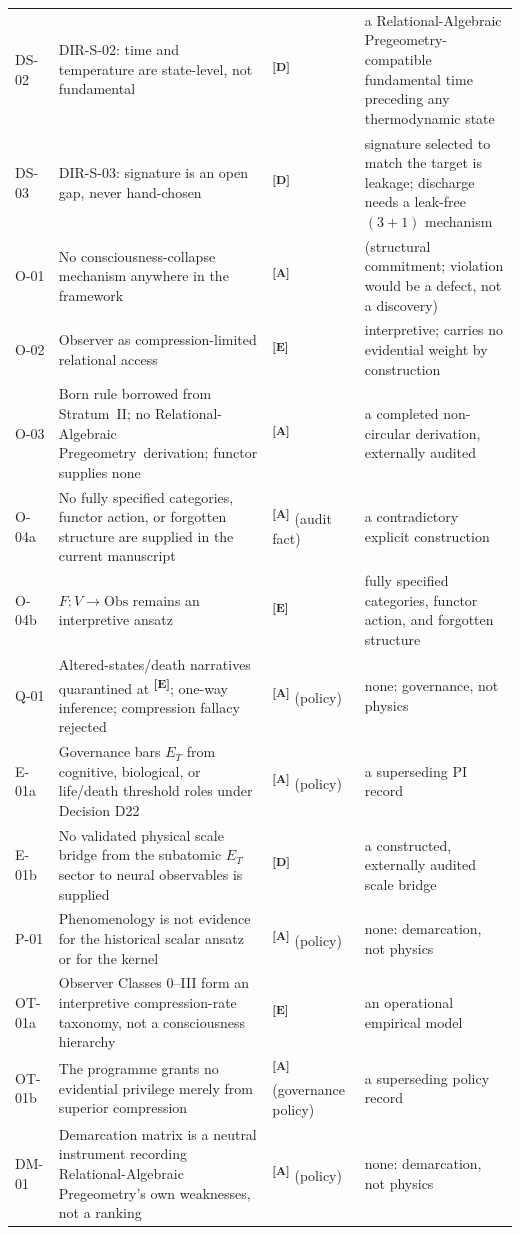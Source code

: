 \documentclass[12pt,a4paper,twoside]{article}
\theoremstyle{plain}
\theoremstyle{definition}
\theoremstyle{remark}
\newcommand{\ProjectShort}{Relational-Algebraic Pregeometry}
\newcommand{\RAP}{\ProjectShort}
\newcommand{\catmark}[1]{\textsuperscript{\textsf{\textbf{[#1]}}}}
\begin{document}
{\begin{longtable}{@{}p{}p{}p{}p{}@{}}
DS-02 & DIR-S-02: time and temperature are state-level, not fundamental &
\catmark{D} & a \RAP-compatible fundamental time preceding any
thermodynamic state \\
DS-03 & DIR-S-03: signature is an open gap, never hand-chosen &
\catmark{D} & signature selected to match the target is leakage; discharge
needs a leak-free $(3{+}1)$ mechanism \\
O-01 & No consciousness-collapse mechanism anywhere in the framework &
\catmark{A} & (structural commitment; violation would be a defect, not
a discovery) \\
O-02 & Observer as compression-limited relational access & \catmark{E}
& interpretive; carries no evidential weight by construction \\
O-03 & Born rule borrowed from Stratum~II; no \RAP\ derivation;
functor supplies none & \catmark{A} & a completed non-circular
derivation, externally audited \\
O-04a & No fully specified categories, functor action, or forgotten structure are supplied in the current manuscript & \catmark{A} (audit fact) & a contradictory explicit construction \\
O-04b & $F\colon V\to\mathrm{Obs}$ remains an interpretive ansatz & \catmark{E} & fully specified categories, functor action, and forgotten structure \\
Q-01 & Altered-states/death narratives quarantined at \catmark{E};
one-way inference; compression fallacy rejected & \catmark{A} (policy)
& none: governance, not physics \\
E-01a & Governance bars $E_T$ from cognitive, biological, or life/death threshold roles under Decision D22 & \catmark{A} (policy) & a superseding PI record \\
E-01b & No validated physical scale bridge from the subatomic $E_T$ sector to neural observables is supplied & \catmark{D} & a constructed, externally audited scale bridge \\
P-01 & Phenomenology is not evidence for the historical scalar ansatz or for the kernel &
\catmark{A} (policy) & none: demarcation, not physics \\
OT-01a & Observer Classes 0--III form an interpretive compression-rate taxonomy, not a consciousness hierarchy & \catmark{E} & an operational empirical model \\
OT-01b & The programme grants no evidential privilege merely from superior compression & \catmark{A} (governance policy) & a superseding policy record \\
DM-01 & Demarcation matrix is a neutral instrument recording \RAP's own
weaknesses, not a ranking & \catmark{A} (policy) & none: demarcation, not
physics \\
\end{longtable}
}
\end{document}
